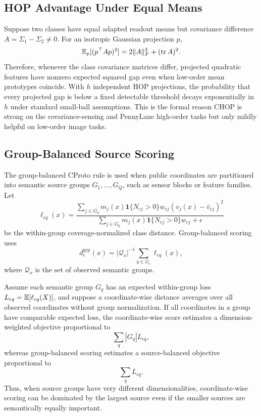 \subsection{HOP Advantage Under Equal Means}

Suppose two classes have equal adapted readout means but covariance difference \(A=\Sigma_1-\Sigma_2\neq0\). For an isotropic Gaussian projection \(p\),
\begin{equation}
    \mathbb{E}_p[(p^\top A p)^2]
    =2\|A\|_F^2+(\operatorname{tr} A)^2.
\end{equation}
Therefore, whenever the class covariance matrices differ, projected quadratic features have nonzero expected squared gap even when low-order mean prototypes coincide. With \(h\) independent HOP projections, the probability that every projected gap is below a fixed detectable threshold decays exponentially in \(h\) under standard small-ball assumptions. This is the formal reason CHOP is strong on the covariance-sensing and PennyLane high-order tasks but only mildly helpful on low-order image tasks.

\subsection{Group-Balanced Source Scoring}

The group-balanced CProto rule is used when public coordinates are partitioned into semantic source groups \(G_1,\ldots,G_Q\), such as sensor blocks or feature families. Let
\begin{equation}
    \ell_{cq}(x)=
    \frac{\sum_{j\in G_q}m_j(x)\mathbf{1}\{N_{cj}>0\}w_{cj}(v_j(x)-\bar v_{cj})^2}
    {\sum_{j\in G_q}m_j(x)\mathbf{1}\{N_{cj}>0\}w_{cj}+\epsilon}
\end{equation}
be the within-group coverage-normalized class distance. Group-balanced scoring uses
\begin{equation}
    d_c^{\mathrm{grp}}(x)=|\mathcal Q_x|^{-1}\sum_{q\in\mathcal Q_x}\ell_{cq}(x),
\end{equation}
where \(\mathcal Q_x\) is the set of observed semantic groups.

\begin{proposition}
Assume each semantic group \(G_q\) has an expected within-group loss \(L_{cq}=\mathbb{E}[\ell_{cq}(X)]\), and suppose a coordinate-wise distance averages over all observed coordinates without group normalization. If all coordinates in a group have comparable expected loss, the coordinate-wise score estimates a dimension-weighted objective proportional to
\begin{equation}
    \sum_q |G_q|L_{cq},
\end{equation}
whereas group-balanced scoring estimates a source-balanced objective proportional to
\begin{equation}
    \sum_q L_{cq}.
\end{equation}
Thus, when source groups have very different dimensionalities, coordinate-wise scoring can be dominated by the largest source even if the smaller sources are semantically equally important.
\end{proposition}

